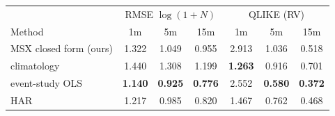 \begin{tabular}{lcccccc}
\toprule
& \multicolumn{3}{c}{RMSE $\log(1+N)$} & \multicolumn{3}{c}{QLIKE (RV)} \\
Method & 1m & 5m & 15m & 1m & 5m & 15m \\
\midrule
MSX closed form (ours) & 1.322 & 1.049 & 0.955 & 2.913 & 1.036 & 0.518 \\
climatology & 1.440 & 1.308 & 1.199 & \textbf{1.263} & 0.916 & 0.701 \\
event-study OLS & \textbf{1.140} & \textbf{0.925} & \textbf{0.776} & 2.552 & \textbf{0.580} & \textbf{0.372} \\
HAR & 1.217 & 0.985 & 0.820 & 1.467 & 0.762 & 0.468 \\
\bottomrule
\end{tabular}